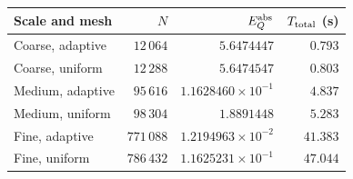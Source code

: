 \begin{tabular}{@{}lrrr@{}}
\toprule
Scale and mesh & $N$ & $E_Q^{\rm abs}$ & $T_{\rm total}$ (s)\\
\midrule
Coarse, adaptive & $12\,064$ & $5.6474447$ & $0.793$\\
Coarse, uniform  & $12\,288$ & $5.6474547$ & $0.803$\\
Medium, adaptive & $95\,616$ & $1.1628460\times10^{-1}$ & $4.837$\\
Medium, uniform  & $98\,304$ & $1.8891448$ & $5.283$\\
Fine, adaptive   & $771\,088$ & $1.2194963\times10^{-2}$ & $41.383$\\
Fine, uniform    & $786\,432$ & $1.1625231\times10^{-1}$ & $47.044$\\
\bottomrule
\end{tabular}
